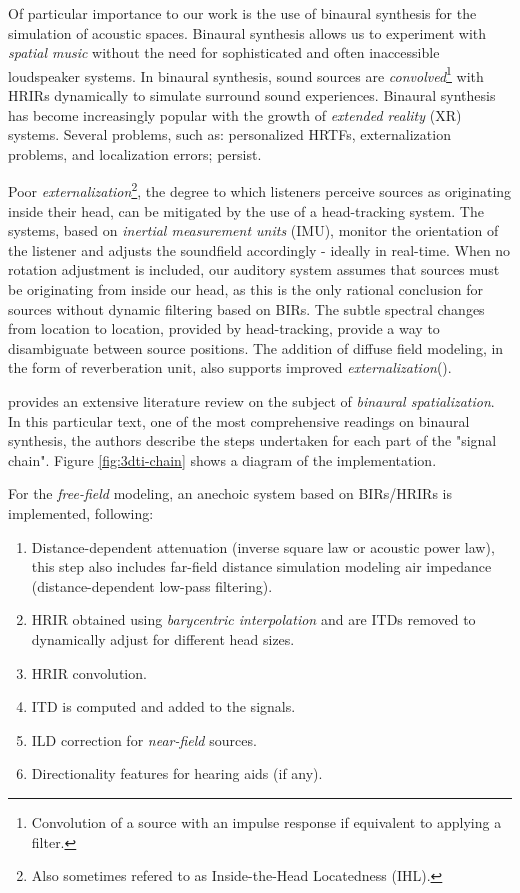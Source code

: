Of particular importance to our work is the use of binaural synthesis for the simulation of acoustic spaces. Binaural synthesis allows us to experiment with \textit{spatial music} without the need for sophisticated and often inaccessible loudspeaker systems. In binaural synthesis, sound sources are \textit{convolved}\footnote{Convolution of a source with an impulse response if equivalent to applying a filter.} with HRIRs dynamically to simulate surround sound experiences. Binaural synthesis has become increasingly popular with the growth of \textit{extended reality} (XR) systems. Several problems, such as: personalized HRTFs, externalization problems, and localization errors; persist. 

Poor \textit{externalization}\footnote{Also sometimes refered to as Inside-the-Head Locatedness (IHL).}, the degree to which listeners perceive sources as originating inside their head, can be mitigated by the use of a head-tracking system. The systems, based on \textit{inertial measurement units} (IMU), monitor the orientation of the listener and adjusts the soundfield accordingly - ideally in real-time. When no rotation adjustment is included, our auditory system assumes that sources must be originating from inside our head, as this is the only rational conclusion for sources without dynamic filtering based on BIRs. The subtle spectral changes from location to location, provided by head-tracking, provide a way to disambiguate between source positions. The addition of diffuse field modeling, in the form of reverberation unit, also supports improved \textit{externalization}(\cite{sakamoto1976out}). 

\cite{cuevas20193d} provides an extensive literature review on the subject of \textit{binaural spatialization}. In this particular text, one of the most comprehensive readings on binaural synthesis, the authors describe the steps undertaken for each part of the "signal chain". Figure \ref{fig:3dti-chain} shows a diagram of the implementation. 

For the \textit{free-field} modeling, an anechoic system based on BIRs/HRIRs is implemented, following:

\begin{enumerate}
    \item Distance-dependent attenuation (inverse square law or acoustic power law), this step also includes far-field distance simulation modeling air impedance (distance-dependent low-pass filtering).
    \item HRIR obtained using \textit{barycentric interpolation} and are ITDs removed to dynamically adjust for different head sizes.
    \item HRIR convolution.
    \item ITD is computed and added to the signals.
    \item ILD correction for \textit{near-field} sources.
    \item Directionality features for hearing aids (if any).
\end{enumerate}

